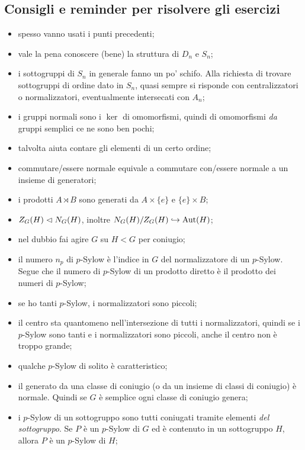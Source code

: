 \subsection{Consigli e reminder per risolvere gli esercizi}
\begin{itemize}
    \item spesso vanno usati i punti precedenti;
    \item vale la pena conoscere (bene) la struttura di $D_n$ e $S_n$;
    \item i sottogruppi di $S_n$ in generale fanno un po' schifo. Alla richiesta di trovare sottogruppi di ordine dato in $S_n$, quasi sempre si risponde con centralizzatori o normalizzatori, eventualmente intersecati con $A_n$;
    \item i gruppi normali sono i $\ker$ di omomorfismi, quindi di omomorfismi \textit{da} gruppi semplici ce ne sono ben pochi;
    \item talvolta aiuta contare gli elementi di un certo ordine;
    \item commutare/essere normale equivale a commutare con/essere normale a un insieme di generatori;
    \item i prodotti $A \rtimes B$ sono generati da $A \times \{e\}$ e $\{e\} \times B$;
    \item $Z_G(H) \vartriangleleft N_G(H)$, inoltre $N_G(H) / Z_G(H) \hookrightarrow \text{Aut}(H)$;
    \item nel dubbio fai agire $G$ su $H < G$ per coniugio;
    \item il numero $n_p$ di $p$-Sylow è l'indice in $G$ del normalizzatore di un $p$-Sylow. Segue che il numero di $p$-Sylow di un prodotto diretto è il prodotto dei numeri di $p$-Sylow;
    \item se ho tanti $p$-Sylow, i normalizzatori sono piccoli;
    \item il centro sta quantomeno nell'intersezione di tutti i normalizzatori, quindi se i $p$-Sylow sono tanti e i normalizzatori sono piccoli, anche il centro non è troppo grande;
    \item qualche $p$-Sylow di solito è caratteristico;
    \item il generato da una classe di coniugio (o da un insieme di classi di coniugio) è normale. Quindi se $G$ è semplice ogni classe di coniugio genera;
    \item i $p$-Sylow di un sottogruppo sono tutti coniugati tramite elementi \textit{del sottogruppo}. Se $P$ è un $p$-Sylow di $G$ ed è contenuto in un sottogruppo $H$, allora $P$ è un $p$-Sylow di $H$;

\end{itemize}
